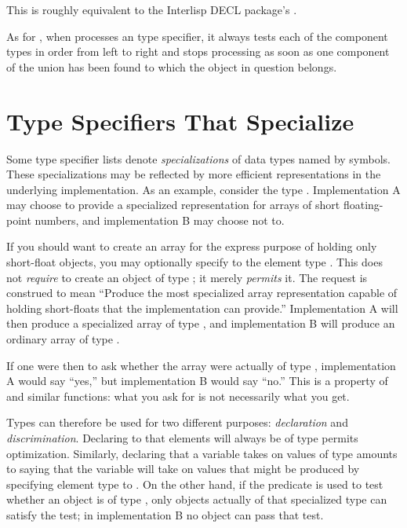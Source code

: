 \begin{flushdesc}
\beforenoterule
\begin{incompatibility}
This is roughly equivalent to
the Interlisp DECL package's .
\end{incompatibility}
\afternoterule

As for ,
when  processes an  type specifier, it always
tests each of the component types in order from left to right
and stops processing as soon as one component of the union has
been found to which the object in question belongs.
\end{flushdesc}

\section{Type Specifiers That Specialize}
\label{SPECIALIZED-TYPE-SPECIFIER-SECTION}

Some type specifier lists denote {\it specializations} of
data types named by symbols.  These specializations may be
reflected by more efficient representations in the underlying
implementation.  As an example, consider the type .
Implementation A may choose to provide a specialized representation
for arrays of short floating-point numbers, and implementation B
may choose not to.

If you should want to create an array for the
express purpose of holding only short-float objects, you may
optionally specify to  the element type
.  This does not {\it require}  to create
an object of type ; it merely {\it permits} it.  The
request is construed to mean ``Produce the most specialized array
representation capable of holding short-floats that the implementation
can provide.''  Implementation A will then produce a specialized
array of type , and implementation B
will produce an ordinary array of type .

If one were then to ask whether the array were actually of type
, implementation A would say ``yes,'' but
implementation B would say ``no.''  This is a property of 
and similar functions: what you ask for is not necessarily what you get.

\begin{obsolete}
Types can therefore be used for two different purposes:
{\it declaration} and {\it discrimination}.  Declaring to 
that elements will always be of type  permits
optimization.  Similarly, declaring that a variable takes on
values of type  amounts to saying that
the variable will take on values that might be produced by specifying
element type  to .
On the other hand, if the predicate  is used to test
whether an object is of type ,
only objects actually of that specialized type can satisfy the test;
in implementation B no object can pass that test.
\end{obsolete}

